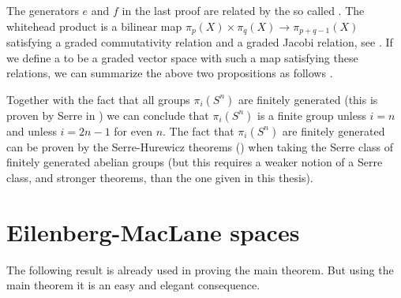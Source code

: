 The generators $e$ and $f$ in the last proof are related by the so called . The whitehead product is a bilinear map $\pi_p(X) \times \pi_q(X) \to \pi_{p+q-1}(X)$ satisfying a graded commutativity relation and a graded Jacobi relation, see \cite{felix}. If we define a  to be a graded vector space with such a map satisfying these relations, we can summarize the above two propositions as follows \cite{berglund}.


Together with the fact that all groups $\pi_i(S^n)$ are finitely generated (this is proven by Serre in \cite{serre}) we can conclude that $\pi_i(S^n)$ is a finite group unless $i=n$ and unless $i=2n-1$ for even $n$. The fact that $\pi_i(S^n)$ are finitely generated can be proven by the Serre-Hurewicz theorems () when taking the Serre class of finitely generated abelian groups (but this requires a weaker notion of a Serre class, and stronger theorems, than the one given in this thesis).


\section{Eilenberg-MacLane spaces}

The following result is already used in proving the main theorem. But using the main theorem it is an easy and elegant consequence.


